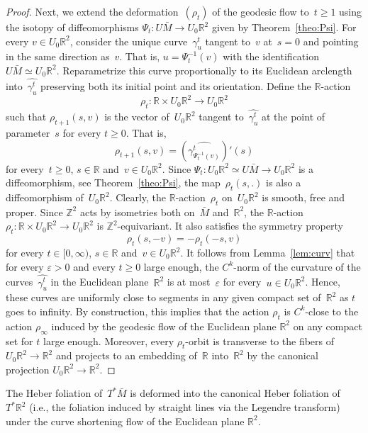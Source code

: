 \documentclass[AHL,Unicode,longabstracts,published]{cedram}
\newcommand{\Z}{\mathbb{Z}}
\newcommand{\R}{\mathbb{R}}
\newcommand{\ie}{i.e.}
\begin{document}
\begin{proof}
Next, we extend the deformation~$(\rho_t)$ of the geodesic flow to~$t \geq 1$ using the isotopy of diffeomorphisms $\Psi_t:U\bar{M} \to U_0\R^2$ given by Theorem~\ref{theo:Psi}. For every $v \in U_0\R^2$, consider the unique curve~$\gamma_u^t$ tangent to~$v$ at~$s=0$ and pointing in the same direction as~$v$. That is, $u=\Psi_t^{-1}(v)$ with the identification $U\bar{M} \simeq U_0\R^2$. Reparametrize this curve proportionally to its Euclidean arclength into~$\widehat{\gamma_u^t}$ preserving both its initial point and its orientation. Define the $\R$-action
\[
\rho_t:\R \times U_0\R^2 \to U_0\R^2
\]
such that $\rho_{t+1}(s,v)$ is the vector of~$U_0\R^2$ tangent to~$\widehat{\gamma_u^t}$ at the point of parameter~$s$ for every $t \geq 0$. That is,
\[
\rho_{t+1}(s,v) = \left(\widehat{\gamma_{\Psi_t^{-1}(v)}^t} \right)'(s)
\]
for every~$t \geq 0$, $s \in \R$ and~$v \in U_0\R^2$. Since $\Psi_t: U_0\R^2 \simeq U\bar{M} \to U_0\R^2$ is a diffeomorphism, see Theorem~\ref{theo:Psi}, the map~$\rho_t(s,.)$ is also a diffeomorphism of~$U_0\R^2$. Clearly, the $\R$-action~$\rho_t$ on~$U_0\R^2$ is smooth, free and proper. Since $\Z^2$ acts by isometries both on~$\bar{M}$ and~$\R^2$, the $\R$-action $\rho_t:\R \times U_0\R^2 \to U_0\R^2$ is $\Z^2$-equivariant. It also satisfies the symmetry property
\[
\rho_t(s,-v) = - \rho_t(-s,v)
\]
for every $t \in [0,\infty)$, $s \in \R$ and~$v \in U_0\R^2$. It follows from Lemma~\ref{lem:curv} that for every $\varepsilon>0$ and every $t\geq 0$ large enough, the $C^k$-norm of the curvature of the curves~$\widehat{\gamma_u^t}$ in the Euclidean plane~$\R^{2}$ is at most~$\varepsilon$ for every~$u\in U_{0}\R^{2}$. Hence, these curves are uniformly close to segments in any given compact set of~$\R^2$ as $t$ goes to infinity. By construction, this implies that the action $\rho_{t}$ is $C^{k}$-close to the action $\rho_{\infty}$ induced by the geodesic flow of the Euclidean plane $\R^{2}$ on any compact set for $t$ large enough. Moreover, every $\rho_t$-orbit is transverse to the fibers of $U_{0}\R^{2}\to\R^{2}$ and projects to an embedding of~$\R$ into~$\R^2$ by the canonical projection $U_0\R^2 \to \R^2$.
\end{proof}



\begin{rema}
The Heber foliation of~$T^*\bar{M}$ is deformed into the canonical Heber foliation of~$T^*\R^2$ (\ie, the foliation induced by straight lines via the Legendre transform) under the curve shortening flow of the Euclidean plane $\R^{2}$.
\end{rema}
\end{document}
